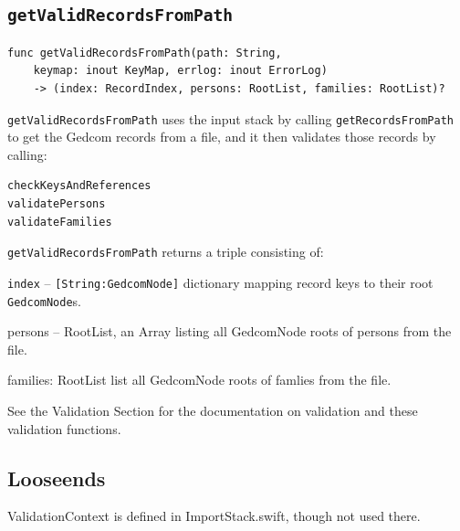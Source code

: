 %
%

\subsection{\texttt{getValidRecordsFromPath}}
\begin{verbatim}
func getValidRecordsFromPath(path: String,
    keymap: inout KeyMap, errlog: inout ErrorLog)
    -> (index: RecordIndex, persons: RootList, families: RootList)?
\end{verbatim}
\texttt{getValidRecordsFromPath} uses the input stack by calling
\texttt{getRecordsFromPath} to get the Gedcom
records from a file, and it then validates those records by
calling:
\begin{verbatim}
checkKeysAndReferences
validatePersons
validateFamilies
\end{verbatim}

\texttt{getValidRecordsFromPath} returns a triple consisting of:

\texttt{index} -- \texttt{[String:GedcomNode]} dictionary mapping
record keys to their root \texttt{GedcomNode}s.

persons -- RootList, an Array listing all GedcomNode roots of
persons from the file.

families: RootList list all GedcomNode roots of famlies
from the file.

See the Validation Section for the documentation on validation and
these validation functions.





\subsection{Looseends}
ValidationContext is defined in ImportStack.swift, though not
used there.
